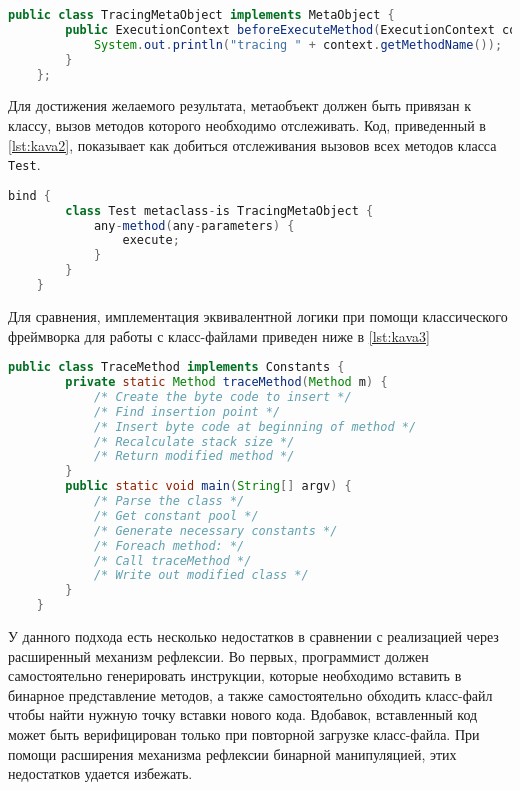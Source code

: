 \begin{lstlisting}[language=Java, caption=Объявление метаобъекта в \texttt{Kava}, label=lst:kava1]
    public class TracingMetaObject implements MetaObject {
        public ExecutionContext beforeExecuteMethod(ExecutionContext context) {
            System.out.println("tracing " + context.getMethodName());
        }
    };
\end{lstlisting}

Для достижения желаемого результата, метаобъект должен быть привязан к классу, вызов методов которого необходимо отслеживать. Код, приведенный в \autoref{lst:kava2}, показывает как добиться отслеживания вызовов всех методов класса \texttt{Test}.

\begin{lstlisting}[language=Java, caption=Привязка класса к метаобъекту в \texttt{Kava}, label=lst:kava2]
    bind {
        class Test metaclass-is TracingMetaObject {
            any-method(any-parameters) {
                execute;
            }
        }
    }
\end{lstlisting}

Для сравнения, имплементация эквивалентной логики при помощи классического фреймворка для работы с класс-файлами приведен ниже в \autoref{lst:kava3}

\begin{lstlisting}[language=Java, caption=Реализация аналогичной функциональности при помощи классического фреймворка для работы с класс-файлом, label=lst:kava3]
    public class TraceMethod implements Constants {
        private static Method traceMethod(Method m) {
            /* Create the byte code to insert */
            /* Find insertion point */
            /* Insert byte code at beginning of method */
            /* Recalculate stack size */
            /* Return modified method */
        }
        public static void main(String[] argv) {
            /* Parse the class */
            /* Get constant pool */
            /* Generate necessary constants */
            /* Foreach method: */
            /* Call traceMethod */
            /* Write out modified class */
        }
    }
\end{lstlisting}

У данного подхода есть несколько недостатков в сравнении с реализацией через расширенный механизм рефлексии. Во первых, программист должен самостоятельно генерировать инструкции, которые необходимо вставить в бинарное представление методов, а также самостоятельно обходить класс-файл чтобы найти нужную точку вставки нового кода. Вдобавок, вставленный код может быть верифицирован только при повторной загрузке класс-файла. При помощи расширения механизма рефлексии бинарной манипуляцией, этих недостатков удается избежать.

